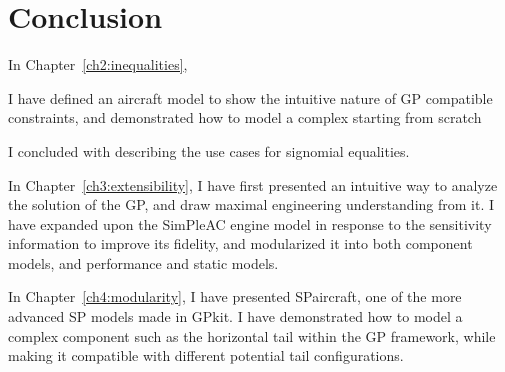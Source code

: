 \chapter{Conclusion}
\label{ch5:conclusion}


In Chapter~\ref{ch2:inequalities},

I have defined an aircraft model to show the intuitive nature of \gls{GP}
compatible constraints, and demonstrated how to model a complex
starting from scratch

I concluded with describing the use cases for signomial equalities.

In Chapter~\ref{ch3:extensibility}, I have first presented an intuitive
way to analyze the solution of the \gls{GP}, and draw maximal engineering
understanding from it. I have expanded upon the SimPleAC engine model
in response to the sensitivity information to improve its fidelity,
and modularized it into both component models, and performance and static models.


In Chapter~\ref{ch4:modularity}, I have presented SPaircraft, one of the more
advanced \gls{SP} models made in GPkit. I have demonstrated how to model
a complex component such as the horizontal tail within the GP framework,
while making it compatible with different potential tail configurations.
